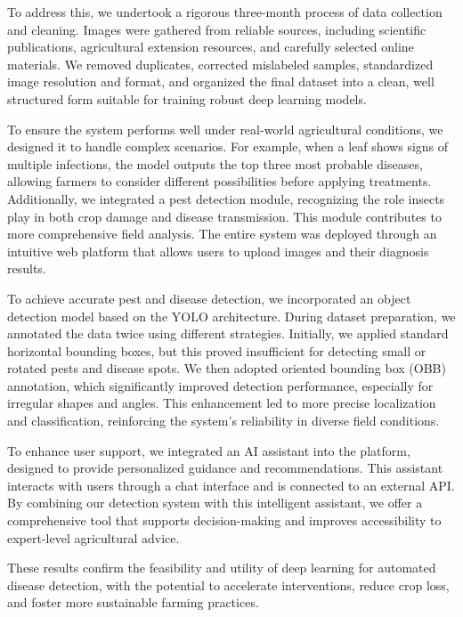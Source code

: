To address this, we undertook a rigorous three-month process of data collection and cleaning. Images were gathered from reliable sources, including scientific publications, agricultural extension resources, and carefully selected online materials. We removed duplicates, corrected mislabeled samples, standardized image resolution and format, and organized the final dataset into a clean, well structured form suitable for training robust deep learning models.


To ensure the system performs well under real-world agricultural conditions, we designed it to handle complex scenarios. For example, when a leaf shows signs of multiple infections, the model outputs the top three most probable diseases, allowing farmers to consider different possibilities before applying treatments. Additionally, we integrated a pest detection module, recognizing the role insects play in both crop damage and disease transmission. This module contributes to more comprehensive field analysis. The entire system was deployed through an intuitive web platform that allows users to upload images and their diagnosis results.


To achieve accurate pest and disease detection, we incorporated an object detection model based on the YOLO architecture. During dataset preparation, we annotated the data twice using different strategies. Initially, we applied standard horizontal bounding boxes, but this proved insufficient for detecting small or rotated pests and disease spots. We then adopted oriented bounding box (OBB) annotation, which significantly improved detection performance, especially for irregular shapes and angles. This enhancement led to more precise localization and classification, reinforcing the system’s reliability in diverse field conditions.


To enhance user support, we integrated an AI assistant into the platform, designed to provide personalized guidance and recommendations. This assistant interacts with users through a chat interface and is connected to an external API. By combining our detection system with this intelligent assistant, we offer a comprehensive tool that supports decision-making and improves accessibility to expert-level agricultural advice.





These results confirm the feasibility and utility of deep learning for automated disease detection, with the potential to accelerate interventions, reduce crop loss, and foster more sustainable farming practices.

